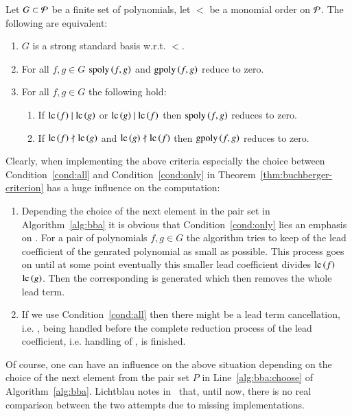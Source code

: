 \begin{theorem}
Let $G \subset \mathcal{P}$ be a finite set of polynomials, let $<$ be a monomial order
on $\mathcal{P}$. The following are equivalent:
\begin{enumerate}
\item $G$ is a strong standard basis w.r.t. $<$.
\item\label{cond:all} For all $f,g \in G$ $\mathrm{spoly}\left({f},{g}\right)$ and $\mathrm{gpoly}\left({f},{g}\right)$ reduce to zero.
\item\label{cond:only} For all $f,g \in G$ the following hold:
\begin{enumerate}
\item If $\mathrm{lc}\left({f}\right) \mid \mathrm{lc}\left({g}\right)$ or $\mathrm{lc}\left({g}\right) \mid \mathrm{lc}\left({f}\right)$ then $\mathrm{spoly}\left({f},{g}\right)$ reduces to zero.
\item If $\mathrm{lc}\left({f}\right) \nmid \mathrm{lc}\left({g}\right)$ and $\mathrm{lc}\left({g}\right) \nmid \mathrm{lc}\left({f}\right)$ then $\mathrm{gpoly}\left({f},{g}\right)$ reduces to zero.
\end{enumerate}
\end{enumerate}
\label{thm:buchberger-criterion}
\end{theorem}

Clearly, when implementing the above criteria especially the choice between
Condition~\ref{cond:all} and Condition~\ref{cond:only} in
Theorem~\ref{thm:buchberger-criterion} has a huge influence on the computation:
\begin{enumerate}
\item Depending the choice of the next element in the pair set in
Algorithm~\ref{alg:bba} it is obvious that Condition~\ref{cond:only} lies an
emphasis on \gpts. For a pair of polynomials $f,g\in G$ the algorithm tries to
keep of the lead coefficient of the genrated polynomial as small as possible.
This process goes on until at some point eventually this smaller lead
coefficient divides $\mathrm{lc}\left({f}\right)$ $\mathrm{lc}\left({g}\right)$. Then the corresponding \spt is generated
which then removes the whole lead term.
\item If we use Condition~\ref{cond:all} then there might be a lead term
cancellation, i.e. \spt, being handled before the complete reduction process of
the lead coefficient, i.e. handling of \gpts, is finished.
\end{enumerate}

Of course, one can have an influence on the above situation depending on the
choice of the next element from the pair set $P$ in Line~\ref{alg:bba:choose} of
Algorithm~\ref{alg:bba}. Lichtblau notes in~\cite{lichtblau2012} that, until
now,
there is no real comparison between the two attempts due to missing
implementations.

